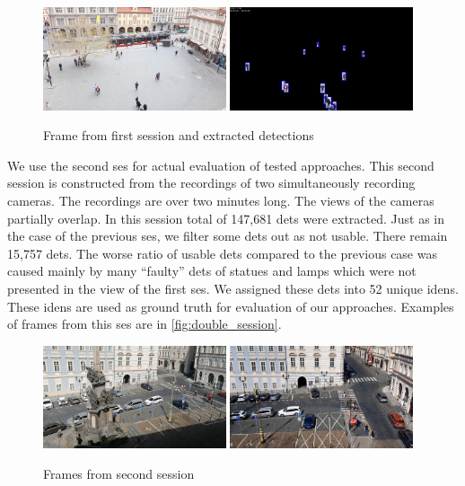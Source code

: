 \begin{figure}
    \centering
    \includegraphics[width=0.48\textwidth]{img/frame_single_session_smaller.png}
    \includegraphics[width=0.48\textwidth]{img/frame_single_session_det_smaller.png}
    \caption{Frame from first session and extracted detections}
    \label{fig:single_session}
\end{figure}

We use the second \gls{ses} for actual evaluation of tested approaches. This second session is constructed from the recordings of two simultaneously recording cameras. The recordings are over two minutes long. The views of the cameras partially overlap. In this session total of 147,681 \glspl{det} were extracted. Just as in the case of the previous \gls{ses}, we filter some \glspl{det} out as not usable. There remain 15,757 \glspl{det}. The worse ratio of usable \glspl{det} compared to the previous case was caused mainly by many ``faulty'' \glspl{det} of statues and lamps which were not presented in the view of the first \gls{ses}. We assigned these \glspl{det} into 52 unique \glspl{iden}. These \glspl{iden} are used as ground truth for evaluation of our approaches. Examples of frames from this \gls{ses} are in \autoref{fig:double_session}.

\begin{figure}
    \centering
    \includegraphics[width=0.48\textwidth]{img/frame_double_session_1_smaller.png}
    \includegraphics[width=0.48\textwidth]{img/frame_double_session_2_smaller.png}
    \caption{Frames from second session}
    \label{fig:double_session}
\end{figure}

